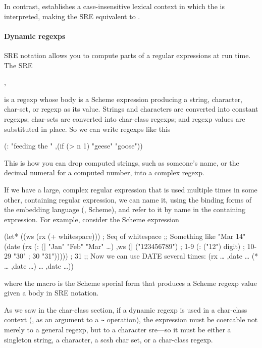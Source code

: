 In contrast,  establishes a case-insensitive lexical
context in which the  is interpreted, making the SRE equivalent to
.


\paragraph{Dynamic regexps}

SRE notation allows you to compute parts of a regular expressions
at run time. The SRE
\begin{code}
,\end{code}%
%
is a regexp whose body  is a Scheme expression producing a
string, character, char-set, or regexp as its value. Strings and
characters are converted into constant regexps; char-sets are converted
into char-class regexps; and regexp values are substituted in place.
So we can write regexps like this
\begin{code}
(: "feeding the "
   ,(if (> n 1) "geese" "goose"))\end{code}%
%
This is how you can drop computed strings, such as someone's name,
or the decimal numeral for a computed number, into a complex regexp.

If we have a large, complex regular expression that is used multiple
times in some other, containing regular expression, we can name it, using 
the binding forms of the embedding language (\eg, Scheme), and refer to
it by name in the containing expression. 
For example, consider the Scheme expression
\begin{code}
(let* ((ws (rx (+ whitespace)))  ; Seq of whitespace
       ;; Something like "Mar 14"
       (date (rx (: (| "Jan" "Feb" "Mar" {\ldots})
                    ,ws
                    (| ("123456789")      ; 1-9
                       (: ("12") digit)   ; 10-29
                       "30"               ; 30
                       "31")))))          ; 31
  ;; Now we can use DATE several times:
  (rx {\ldots} ,date {\ldots} (* {\ldots} ,date {\ldots})       
      {\ldots} ,date {\ldots}))\end{code}%
%
where the  
macro is the Scheme special form that produces
a Scheme regexp value given a body in SRE notation.

As we saw in the char-class section, if a dynamic regexp is used
in a char-class context (\eg, as an argument to a \verb|~| operation),
the expression must be coercable not merely to a general regexp,
but to a character sre---so it must be either a singleton string,
a character, a scsh char set, or a char-class regexp.

